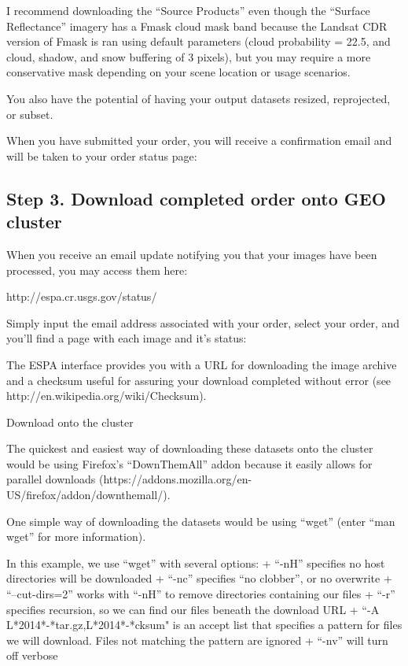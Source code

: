 \documentclass{article}
\begin{document}
I recommend downloading the ``Source Products'' even though the
``Surface Reflectance'' imagery has a Fmask cloud mask band because the
Landsat CDR version of Fmask is ran using default parameters (cloud
probability = 22.5, and cloud, shadow, and snow buffering of 3 pixels),
but you may require a more conservative mask depending on your scene
location or usage scenarios.

You also have the potential of having your output datasets resized,
reprojected, or subset.

When you have submitted your order, you will receive a confirmation
email and will be taken to your order status page:

    \subsection{Step 3. Download completed order onto GEO
cluster}\label{step-3.-download-completed-order-onto-geo-cluster}

When you receive an email update notifying you that your images have
been processed, you may access them here:

http://espa.cr.usgs.gov/status/

Simply input the email address associated with your order, select your
order, and you'll find a page with each image and it's status:

The ESPA interface provides you with a URL for downloading the image
archive and a checksum useful for assuring your download completed
without error (see http://en.wikipedia.org/wiki/Checksum).

Download onto the cluster

The quickest and easiest way of downloading these datasets onto the
cluster would be using Firefox's ``DownThemAll'' addon because it easily
allows for parallel downloads
(https://addons.mozilla.org/en-US/firefox/addon/downthemall/).

One simple way of downloading the datasets would be using ``wget''
(enter ``man wget'' for more information).

In this example, we use ``wget'' with several options: + ``-nH''
specifies no host directories will be downloaded + ``-nc'' specifies
``no clobber'', or no overwrite + ``--cut-dirs=2'' works with ``-nH'' to
remove directories containing our files + ``-r'' specifies recursion, so
we can find our files beneath the download URL + ``-A
L*2014*-*tar.gz,L*2014*-*cksum" is an accept list that specifies a
pattern for files we will download. Files not matching the pattern are
ignored + ``-nv'' will turn off verbose
\end{document}
